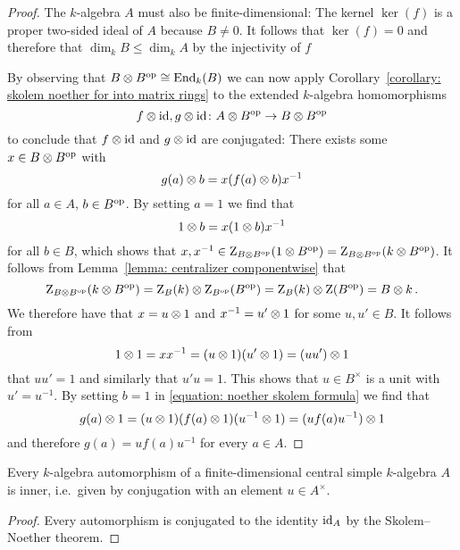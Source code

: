 \begin{proof}
  The $k$-algebra $A$ must also be finite-dimensional:
  The kernel $\ker(f)$ is a proper two-sided ideal of $A$ because $B \neq 0$.
  It follows that $\ker(f) = 0$ and therefore that $\dim_k B \leq \dim_k A$ by the injectivity of $f$
  
  By observing that $B \mathbin{\otimes} B^{\operatorname{op}} \cong \operatorname{End}_k(B)$ we can now apply Corollary~\ref{corollary: skolem noether for into matrix rings} to the extended $k$-algebra homomorphisms
  \[
            f \mathbin{\otimes} \operatorname{id}, g \mathbin{\otimes} \operatorname{id}
    \colon  A \mathbin{\otimes} B^{\operatorname{op}}
    \to     B \mathbin{\otimes} B^{\operatorname{op}}
  \]
  to conclude that $f \mathbin{\otimes} \operatorname{id}$ and $g \mathbin{\otimes} \operatorname{id}$ are conjugated:
  There exists some $x \in B \mathbin{\otimes} B^{\operatorname{op}}$ with
  \begin{equation}
    \label{equation: noether skolem formula}
      g(a) \mathbin{\otimes} b
    = x ( f(a) \mathbin{\otimes} b ) x^{-1}
  \end{equation}
  for all $a \in A$, $b \in B^{\operatorname{op}}$.
  By setting $a = 1$ we find that
  \[
      1 \mathbin{\otimes} b
    = x (1 \mathbin{\otimes} b) x^{-1}
  \]
  for all $b \in B$, which shows that $x, x^{-1} \in \operatorname{Z}_{B \mathbin{\otimes} B^{\operatorname{op}}}(1 \mathbin{\otimes} B^{\operatorname{op}}) = \operatorname{Z}_{B \mathbin{\otimes} B^{\operatorname{op}}}(k \mathbin{\otimes} B^{\operatorname{op}})$.
  It follows from Lemma~\ref{lemma: centralizer componentwise} that
  \[
      \operatorname{Z}_{B \mathbin{\otimes} B^{\operatorname{op}}}(k \mathbin{\otimes} B^{\operatorname{op}})
    = \operatorname{Z}_{B}(k) \mathbin{\otimes} \operatorname{Z}_{B^{\operatorname{op}}}(B^{\operatorname{op}})
    = \operatorname{Z}_{B}(k) \mathbin{\otimes} \operatorname{Z}(B^{\operatorname{op}})
    = B \mathbin{\otimes} k \,.
  \]
  We therefore have that $x = u \mathbin{\otimes} 1$ and $x^{-1} = u' \mathbin{\otimes} 1$ for some $u, u' \in B$.
  It follows from
  \[
      1 \mathbin{\otimes} 1
    = x x^{-1}
    = (u \mathbin{\otimes} 1) (u' \mathbin{\otimes} 1)
    = (u u') \mathbin{\otimes} 1
  \]
  that $u u' = 1$ and similarly that $u' u = 1$.
  This shows that $u \in B^\times$ is a unit with $u' = u^{-1}$.
  By setting $b = 1$ in \eqref{equation: noether skolem formula} we find that
  \[
      g(a) \mathbin{\otimes} 1
    = (u \mathbin{\otimes} 1) (f(a) \mathbin{\otimes} 1) (u^{-1} \mathbin{\otimes} 1)
    = (u f(a) u^{-1}) \mathbin{\otimes} 1
  \]
  and therefore $g(a) = u f(a) u^{-1}$ for every $a \in A$.
\end{proof}


\begin{corollary}
  \label{corollary: skolem noether for automorphisms}
  Every $k$-algebra automorphism of a finite-dimensional central simple $k$-algebra $A$ is inner, i.e.\ given by conjugation with an element $u \in A^\times$.
\end{corollary}


\begin{proof}
  Every automorphism is conjugated to the identity $\operatorname{id}_A$ by the Skolem--Noether theorem.
\end{proof}



